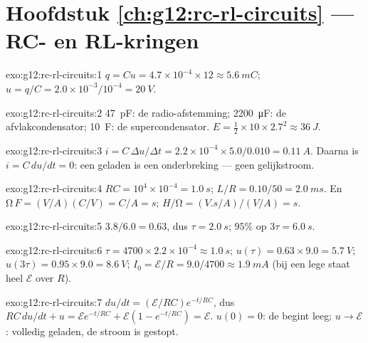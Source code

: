 \section*{Hoofdstuk \ref{ch:g12:rc-rl-circuits} --- RC- en RL-kringen}

\begin{solution}{exo:g12:rc-rl-circuits:1}
$q = Cu = 4.7\times10^{-4} \times 12 \approx \qty{5.6}{mC}$;
$u = q/C = 2.0\times10^{-3}/10^{-4} = \qty{20}{V}$.
\end{solution}

\begin{solution}{exo:g12:rc-rl-circuits:2}
\qty{47}{pF}: de radio-afstemming; \qty{2200}{\micro F}: de
afvlakcondensator; \qty{10}{F}: de supercondensator.
$E = \tfrac12 \times 10 \times 2.7^2 \approx \qty{36}{J}$.
\end{solution}

\begin{solution}{exo:g12:rc-rl-circuits:3}
$i = C\,\Delta u/\Delta t = 2.2\times10^{-4} \times 5.0/0.010 =
\qty{0.11}{A}$. Daarna is $i = C\,du/dt = 0$: een geladen  is een
onderbreking --- geen gelijkstroom.
\end{solution}

\begin{solution}{exo:g12:rc-rl-circuits:4}
$RC = 10^4 \times 10^{-4} = \qty{1.0}{s}$;
$L/R = 0.10/50 = \qty{2.0}{ms}$. En $\unit{\ohm}\,\unit{F} =
(\unit{V/A})(\unit{C/V}) = \unit{C/A} = \unit{s}$;
$\unit{H}/\unit{\ohm} = (\unit{V.s/A})/(\unit{V/A}) = \unit{s}$.
\end{solution}

\begin{solution}{exo:g12:rc-rl-circuits:5}
$3.8/6.0 = 0.63$, dus $\tau = \qty{2.0}{s}$; $95\%$ op
$3\tau = \qty{6.0}{s}$.
\end{solution}

\begin{solution}{exo:g12:rc-rl-circuits:6}
$\tau = 4700 \times 2.2\times10^{-4} \approx \qty{1.0}{s}$;
$u(\tau) = 0.63 \times 9.0 = \qty{5.7}{V}$;
$u(3\tau) = 0.95 \times 9.0 = \qty{8.6}{V}$;
$I_0 = \mathcal{E}/R = 9.0/4700 \approx \qty{1.9}{mA}$ (bij een lege
 staat heel $\mathcal{E}$ over $R$).
\end{solution}

\begin{solution}{exo:g12:rc-rl-circuits:7}
$du/dt = (\mathcal{E}/RC)e^{-t/RC}$, dus $RC\,du/dt + u =
\mathcal{E}e^{-t/RC} + \mathcal{E}(1 - e^{-t/RC}) = \mathcal{E}$.
$u(0) = 0$: de  begint leeg; $u \to \mathcal{E}$: volledig geladen,
de stroom is gestopt.
\end{solution}


